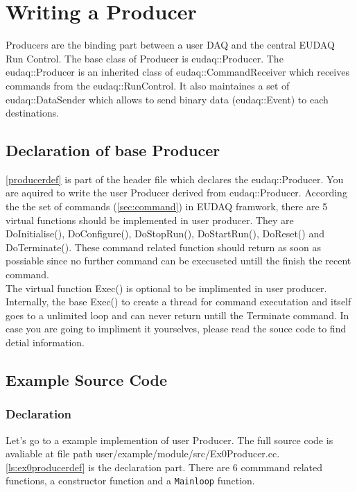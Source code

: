 \section{Writing a Producer}\label{sec:ProducerWriting}
Producers are the binding part between a user DAQ and the central EUDAQ Run Control. The base class of Producer is eudaq::Producer. The eudaq::Producer is an inherited class of eudaq::CommandReceiver which receives commands from the eudaq::RunControl. It also maintaines a set of eudaq::DataSender which allows to send binary data (eudaq::Event) to each destinations.\\

\subsection{Declaration of base Producer}\label{sec:Producer_hh}

\autoref{producerdef} is part of the header file which declares the eudaq::Producer. You are aquired to write the user Producer derived from eudaq::Producer. According the the set of commands (\autoref{sec:command}) in EUDAQ framwork, there are 5 virtual functions should be implemented in user producer. They are DoInitialise(), DoConfigure(), DoStopRun(), DoStartRun(), DoReset() and DoTerminate(). These command related function should return as soon as possiable since no further command can be execuseted untill the finish the recent command. \\



The virtual function Exec() is optional to be implimented in user producer. Internally, the base Exec() to create a thread for command executation and itself goes to a unlimited loop and can never return untill the Terminate command. In case you are going to impliment it yourselves, please read the souce code to find detial information.

\subsection{Example Source Code}\label{sec:Ex0Producer_cc}
\subsubsection{Declaration}
Let's go to a example implemention of user Producer. The full source code is avaliable at file path user/example/module/src/Ex0Producer.cc.  \autoref{ls:ex0producerdef} is the declaration part. There are 6 commmand related functions, a constructor function and a \texttt{Mainloop} function. \\


